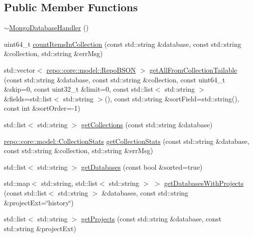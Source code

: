 \subsection*{Public Member Functions}
\begin{DoxyCompactItemize}
\item 
\hyperlink{classrepo_1_1core_1_1handler_1_1_mongo_database_handler_a5a8444437b564686632dce0ec6f592fb}{$\sim$\+Mongo\+Database\+Handler} ()
\item 
uint64\+\_\+t \hyperlink{classrepo_1_1core_1_1handler_1_1_mongo_database_handler_ad69882e8c3573be494c5b6eca6a53827}{count\+Items\+In\+Collection} (const std\+::string \&database, const std\+::string \&collection, std\+::string \&err\+Msg)
\item 
std\+::vector$<$ \hyperlink{classrepo_1_1core_1_1model_1_1_repo_b_s_o_n}{repo\+::core\+::model\+::\+Repo\+B\+S\+O\+N} $>$ \hyperlink{classrepo_1_1core_1_1handler_1_1_mongo_database_handler_a3083dc4c2983681aa2b356c87bcaeca3}{get\+All\+From\+Collection\+Tailable} (const std\+::string \&database, const std\+::string \&collection, const uint64\+\_\+t \&skip=0, const uint32\+\_\+t \&limit=0, const std\+::list$<$ std\+::string $>$ \&fields=std\+::list$<$ std\+::string $>$(), const std\+::string \&sort\+Field=std\+::string(), const int \&sort\+Order=-\/1)
\item 
std\+::list$<$ std\+::string $>$ \hyperlink{classrepo_1_1core_1_1handler_1_1_mongo_database_handler_ad51771cf9bca612634c4e761266c5d32}{get\+Collections} (const std\+::string \&database)
\item 
\hyperlink{classrepo_1_1core_1_1model_1_1_collection_stats}{repo\+::core\+::model\+::\+Collection\+Stats} \hyperlink{classrepo_1_1core_1_1handler_1_1_mongo_database_handler_a61020c951e94df65b9afb29bcd5472d7}{get\+Collection\+Stats} (const std\+::string \&database, const std\+::string \&collection, std\+::string \&err\+Msg)
\item 
std\+::list$<$ std\+::string $>$ \hyperlink{classrepo_1_1core_1_1handler_1_1_mongo_database_handler_ad87a0ae0ba7fb783479d399b6f98ee67}{get\+Databases} (const bool \&sorted=true)
\item 
std\+::map$<$ std\+::string, std\+::list$<$ std\+::string $>$ $>$ \hyperlink{classrepo_1_1core_1_1handler_1_1_mongo_database_handler_aa6ad44a0cde0f642d52cc92a61178739}{get\+Databases\+With\+Projects} (const std\+::list$<$ std\+::string $>$ \&databases, const std\+::string \&project\+Ext=\char`\"{}history\char`\"{})
\item 
std\+::list$<$ std\+::string $>$ \hyperlink{classrepo_1_1core_1_1handler_1_1_mongo_database_handler_a84c34b3c1f0ba3227d4a159176bdfb7f}{get\+Projects} (const std\+::string \&database, const std\+::string \&project\+Ext)

\end{DoxyCompactItemize}
